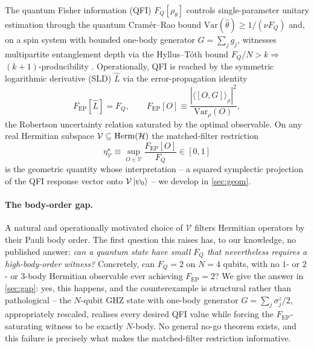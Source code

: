 \documentclass[11pt,a4paper]{article}
\newcommand{\FQ}{F_Q}
\newcommand{\FEP}{F_{\mathrm{EP}}}
\newcommand{\Var}{\mathrm{Var}}
\newcommand{\SLD}{\hat{L}}
\newcommand{\PsiZ}{\ket{\psi_0}}
\begin{document}
The quantum Fisher information (QFI) $\FQ[\rho_\theta]$ controls
single-parameter unitary estimation through the quantum
Cram\'er--Rao bound $\Var(\hat\theta)\ge1/(\nu\FQ)$
\cite{Helstrom1969,Holevo1982,Braunstein1994,Paris2009} and, on a
spin system with bounded one-body generator $G=\sum_jg_j$,
witnesses multipartite entanglement depth via the Hyllus--T\'oth
bound $\FQ/N>k\Rightarrow$ $(k+1)$-producibility
\cite{Pezze2009,Hyllus2012,Toth2012,Pezze2018,Frowis2018}.
Operationally, QFI is reached by the symmetric logarithmic
derivative (SLD) $\SLD$ via the error-propagation identity
\begin{equation}
   \FEP[\SLD]=\FQ,\qquad
   \FEP[O]\equiv\frac{|\langle[O,G]\rangle_\rho|^2}{\Var_\rho(O)},
   \label{eq:FEP_L_FQ}
\end{equation}
the Robertson uncertainty relation saturated by the optimal
observable.  On any real Hermitian subspace
$\mathcal V\subseteq{\rm Herm}(\mathcal H)$ the matched-filter
restriction
\begin{equation}
   \eta^\star_{\mathcal V}\equiv\sup_{O\in\mathcal V}\frac{\FEP[O]}{\FQ}
   \in[0,1]
   \label{eq:eta_star_intro}
\end{equation}
is the geometric quantity whose interpretation -- a squared
symplectic projection of the QFI response vector onto
$\mathcal V\PsiZ$ -- we develop in \cref{sec:geom}.

\paragraph{The body-order gap.}  A natural and operationally
motivated choice of $\mathcal V$ filters Hermitian operators by
their Pauli body order.  The first question this raises has, to our
knowledge, no published answer: \emph{can a quantum state have
small $\FQ$ that nevertheless requires a high-body-order witness?}
Concretely, can $\FQ=2$ on $N=4$ qubits, with no $1$- or $2$- or
$3$-body Hermitian observable ever achieving $\FEP=2$?  We give
the answer in \cref{sec:gap}: yes, this happens, and the
counterexample is structural rather than pathological -- the
$N$-qubit GHZ state with one-body generator $G=\sum_j\sigma^z_j/2$,
appropriately rescaled, realises every desired QFI value while
forcing the $\FEP$-saturating witness to be exactly $N$-body.  No
general no-go theorem exists, and this failure is precisely what
makes the matched-filter restriction informative.
\end{document}

